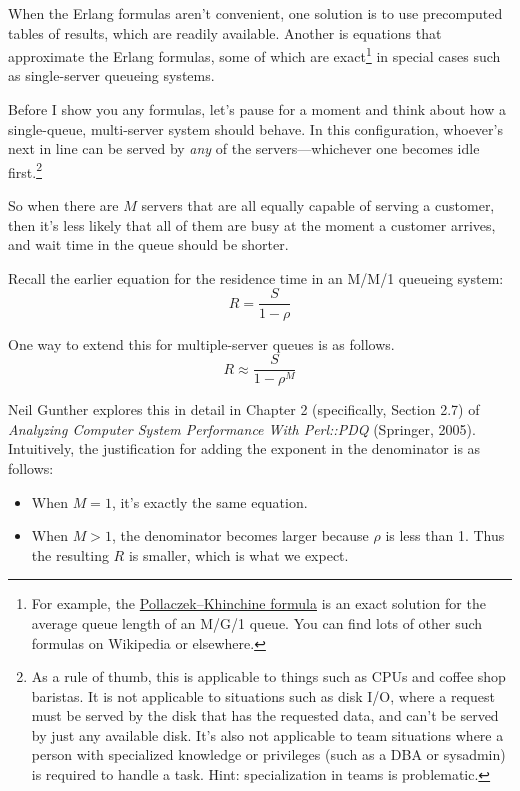 \documentclass{vivid_layout}
\begin{document}
When the Erlang formulas aren't convenient, one solution is to use precomputed tables of results, which are readily available. Another is equations that approximate the Erlang formulas, some of which are exact\footnote{For example, the \href{https://en.wikipedia.org/wiki/Pollaczek\%E2\%80\%93Khinchine_formula}{Pollaczek–Khinchine formula} is an exact solution for the average queue length of an M/G/1 queue. You can find lots of other such formulas on Wikipedia or elsewhere.} in special cases such as single-server queueing systems.

Before I show you any formulas, let's pause for a moment and think about how a single-queue, multi-server system should behave. In this configuration, whoever's next in line can be served by {\itshape any} of the servers---whichever one becomes idle first.\footnote{As a rule of thumb, this is applicable to things such as CPUs and coffee shop baristas. It is not applicable to situations such as disk I/O, where a request must be served by the disk that has the requested data, and can't be served by just any available disk. It's also not applicable to team situations where a person with specialized knowledge or privileges (such as a DBA or sysadmin) is required to handle a task. Hint: specialization in teams is problematic.}

So when there are \( M \) servers that are all equally capable of serving a customer, then it's less likely that all of them are busy at the moment a customer arrives, and wait time in the queue should be shorter. 

Recall the earlier equation for the residence time in an M/M/1 queueing system:
\[
  R = \frac{S}{1 - \rho}
\]

One way to extend this for multiple-server queues is as follows.
\[
  R \approx \frac{S}{ 1-\rho^M }
\]

Neil Gunther explores this in detail in Chapter 2 (specifically, Section 2.7) of {\itshape Analyzing Computer System Performance With Perl::PDQ} (Springer, 2005). Intuitively, the justification for adding the exponent in the denominator is as follows:

\begin{itemize}
\item When \( M=1 \), it's exactly the same equation.
\item When \( M > 1 \), the denominator becomes larger because \( \rho \) is less than 1. Thus the resulting \( R \) is smaller, which is what we expect.
\end{itemize}
\end{document}
